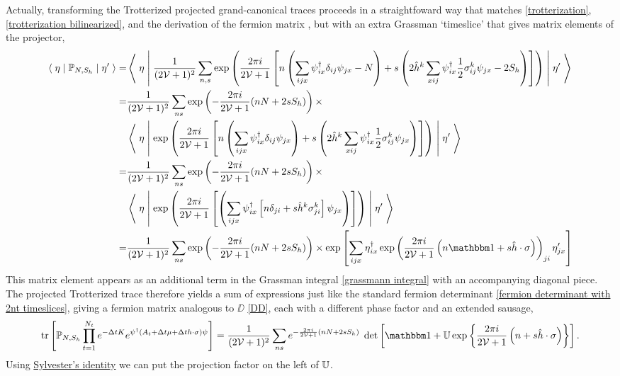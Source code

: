 Actually, transforming the Trotterized projected grand-canonical traces proceeds in a straightfoward way that matches \eqref{trotterization}, \eqref{trotterization bilinearized}, and the derivation of the fermion matrix , but with an extra Grassman `timeslice' that gives matrix elements of the projector,
\begin{align}
    \matrixElement{\eta}{ \PP_{N, S_h} }{\eta'}
    =&
    \matrixElement{\eta}{
        \oneover{(2\Volume+1)^2}\sum_{n,s} \exp\left(\frac{2\pi i}{2\Volume+1}\left[ n \left(\sum_{ijx}\psi\adjoint_{ix} \delta_{ij}\psi_{jx} -N\right) + s \left(2 \hat{h}^k \sum_{xij}\psi\adjoint_{ix} \half \sigma_{ij}^k \psi_{jx} - 2S_h\right)\right]\right)
    }{\eta'}
    \nonumber\\
    =&
    \oneover{(2\Volume+1)^2}\sum_{ns} \exp\left(-\frac{2\pi i}{2\Volume+1} (nN+2s S_h)\right)\times
    \nonumber\\
    &\matrixElement{\eta}{
        \exp\left(\frac{2\pi i}{2\Volume+1}\left[ n \left(\sum_{ijx}\psi\adjoint_{ix} \delta_{ij}\psi_{jx}\right) + s \left(2 \hat{h}^k \sum_{xij}\psi\adjoint_{ix} \half \sigma_{ij}^k \psi_{jx}\right)\right]\right)
    }{\eta'}
    \nonumber\\
    =&
    \oneover{(2\Volume+1)^2}\sum_{ns} \exp\left(-\frac{2\pi i}{2\Volume+1} (nN+2s S_h)\right)\times
    \nonumber\\
    &\matrixElement{\eta}{
        \exp\left(\frac{2\pi i}{2\Volume+1}\left[ \left(\sum_{ijx}\psi\adjoint_{ix}\left[n \delta_{ji} + s \hat{h}^k\sigma_{ji}^k\right]\psi_{jx}\right) \right]\right)
    }{\eta'}
    \nonumber\\
    =&
    \oneover{(2\Volume+1)^2}\sum_{ns} \exp\left(-\frac{2\pi i}{2\Volume+1} (nN+2s S_h)\right)\times
    \exp\left[
        \sum_{ijx}
        \eta\adjoint_{ix}
            \exp\left( \frac{2\pi i}{2\Volume+1} \left(n\one + s \hat{h}\cdot \sigma\right) \right)_{ji}
        \eta'_{jx}
    \right]
\end{align}
This matrix element appears as an additional term in the Grassman integral \eqref{grassmann integral} with an accompanying diagonal piece.
The projected Trotterized trace therefore yields a sum of expressions just like the standard fermion determinant \eqref{fermion determinant with 2nt timeslices}, giving a fermion matrix analogous to $\DD$ \eqref{DD}, each with a different phase factor and an extended sausage,
\begin{align}
    \tr{\PP_{N,S_h} \prod_{t=1}^{N_t} e^{-\Delta t K}e^{\psi\adjoint\left(A_t + \Delta t \mu + \Delta t h\cdot\sigma\right)\psi}}
    =
    \oneover{(2\Volume+1)^2} \sum_{ns} e^{-\frac{2\pi i}{2\Volume+1} (nN+2sS_h)}\; \det\left[ \one + \UU \exp\left\{ \frac{2\pi i}{2\Volume+1}\left(n + s \hat{h} \cdot \sigma\right)\right\}\right].
\end{align}
Using \href{https://en.wikipedia.org/wiki/Determinant#Sylvester's\_determinant\_theorem}{Sylvester's identity} we can put the projection factor on the left of $\mathbb{U}$.

